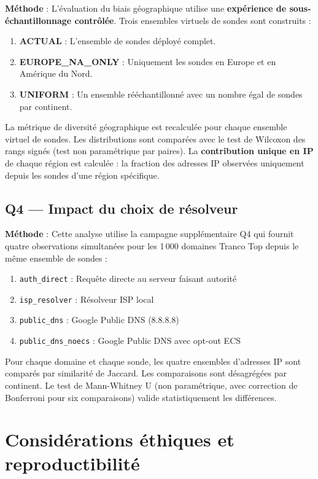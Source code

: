 \textbf{Méthode} : L'évaluation du biais géographique utilise une \textbf{expérience de sous-échantillonnage contrôlée}. Trois ensembles virtuels de sondes sont construits :

\begin{enumerate}
  \item \textbf{ACTUAL} : L'ensemble de sondes déployé complet.
  \item \textbf{EUROPE\_NA\_ONLY} : Uniquement les sondes en Europe et en Amérique du Nord.
  \item \textbf{UNIFORM} : Un ensemble rééchantillonné avec un nombre égal de sondes par continent.
\end{enumerate}

La métrique de diversité géographique est recalculée pour chaque ensemble virtuel de sondes. Les distributions sont comparées avec le test de Wilcoxon des rangs signés (test non paramétrique par paires). La \textbf{contribution unique en IP} de chaque région est calculée : la fraction des adresses IP observées uniquement depuis les sondes d'une région spécifique.

\subsection{Q4 --- Impact du choix de résolveur}
\label{subsec:3.5.4}

\textbf{Méthode} : Cette analyse utilise la campagne supplémentaire Q4 qui fournit quatre observations simultanées pour les 1\,000 domaines Tranco Top depuis le même ensemble de sondes :

\begin{enumerate}
  \item \texttt{auth\_direct} : Requête directe au serveur faisant autorité
  \item \texttt{isp\_resolver} : Résolveur ISP local
  \item \texttt{public\_dns} : Google Public DNS (8.8.8.8)
  \item \texttt{public\_dns\_noecs} : Google Public DNS avec opt-out ECS
\end{enumerate}

Pour chaque domaine et chaque sonde, les quatre ensembles d'adresses IP sont comparés par similarité de Jaccard. Les comparaisons sont désagrégées par continent. Le test de Mann-Whitney U (non paramétrique, avec correction de Bonferroni pour six comparaisons) valide statistiquement les différences.

\bigskip
\section{Considérations éthiques et reproductibilité}
\label{sec:3.6}

